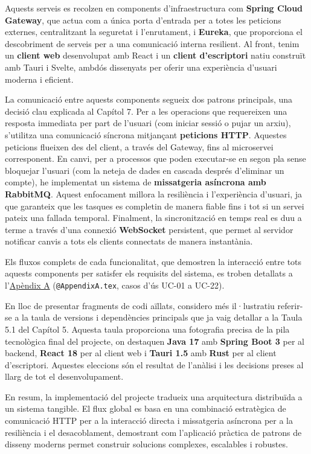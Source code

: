 Aquests serveis es recolzen en components d'infraestructura com \textbf{Spring Cloud Gateway}, que actua com a única porta d'entrada per a totes les peticions externes, centralitzant la seguretat i l'enrutament, i \textbf{Eureka}, que proporciona el descobriment de serveis per a una comunicació interna resilient. Al front, tenim un \textbf{client web} desenvolupat amb React i un \textbf{client d'escriptori} natiu construït amb Tauri i Svelte, ambdós dissenyats per oferir una experiència d'usuari moderna i eficient.

La comunicació entre aquests components segueix dos patrons principals, una decisió clau explicada al Capítol 7. Per a les operacions que requereixen una resposta immediata per part de l'usuari (com iniciar sessió o pujar un arxiu), s'utilitza una comunicació síncrona mitjançant \textbf{peticions HTTP}. Aquestes peticions flueixen des del client, a través del Gateway, fins al microservei corresponent. En canvi, per a processos que poden executar-se en segon pla sense bloquejar l'usuari (com la neteja de dades en cascada després d'eliminar un compte), he implementat un sistema de \textbf{missatgeria asíncrona amb RabbitMQ}. Aquest enfocament millora la resiliència i l'experiència d'usuari, ja que garanteix que les tasques es completin de manera fiable fins i tot si un servei pateix una fallada temporal. Finalment, la sincronització en temps real es duu a terme a través d'una connexió \textbf{WebSocket} persistent, que permet al servidor notificar canvis a tots els clients connectats de manera instantània.

Els fluxos complets de cada funcionalitat, que demostren la interacció entre tots aquests components per satisfer els requisits del sistema, es troben detallats a l'\hyperref[AppendixA]{Apèndix A} (\texttt{@AppendixA.tex}, casos d'ús UC-01 a UC-22).

En lloc de presentar fragments de codi aïllats, considero més il·lustratiu referir-se a la taula de versions i dependències principals que ja vaig detallar a la Taula 5.1 del Capítol 5. Aquesta taula proporciona una fotografia precisa de la pila tecnològica final del projecte, on destaquen \textbf{Java 17} amb \textbf{Spring Boot 3} per al backend, \textbf{React 18} per al client web i \textbf{Tauri 1.5} amb \textbf{Rust} per al client d'escriptori. Aquestes eleccions són el resultat de l'anàlisi i les decisions preses al llarg de tot el desenvolupament.

En resum, la implementació del projecte tradueix una arquitectura distribuïda a un sistema tangible. El flux global es basa en una combinació estratègica de comunicació HTTP per a la interacció directa i missatgeria asíncrona per a la resiliència i el desacoblament, demostrant com l'aplicació pràctica de patrons de disseny moderns permet construir solucions complexes, escalables i robustes. 

